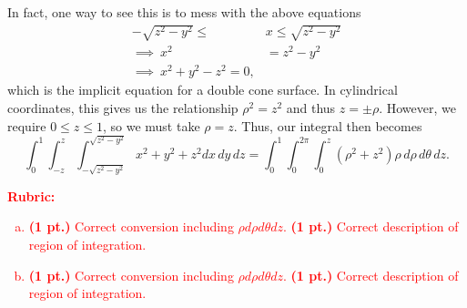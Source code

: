 \documentclass[12pt]{article} %
\begin{document}
\begin{solution}
\begin{enumerate}[(a)]
    In fact, one way to see this is to mess with the above equations
    \begin{align*}
        -\sqrt{z^2-y^2}\leq &x \leq \sqrt{z^2-y^2} \\
        \implies ~ x^2&= z^2-y^2 \\
        \implies ~ x^2+y^2-z^2=0,
    \end{align*}
    which is the implicit equation for a double cone surface. In cylindrical coordinates, this gives us the relationship $\rho^2=z^2$ and thus $z=\pm\rho$. However, we require $0\leq z \leq 1$, so we must take $\rho=z$.  Thus, our integral then becomes
    \[
    \int_0^1 \int_{-z}^z \int_{-\sqrt{z^2-y^2}}^{\sqrt{z^2-y^2}} x^2+y^2+z^2 dx\,dy\,dz = \int_{0}^1 \int_0^{2\pi} \int_{0}^z \left(\rho^2 + z^2 \right) \rho \, d\rho \, d \theta\, dz. 
    \]
    \end{enumerate}
\end{solution}
\vspace*{1cm}
\textcolor{red}{
\noindent \textbf{Rubric:}
\begin{enumerate}[(a)]
    \item \textbf{(1 pt.)} Correct conversion including $\rho d\rho d \theta dz$. \textbf{(1 pt.)} Correct description of region of integration.
	\item \textbf{(1 pt.)} Correct conversion including $\rho d\rho d \theta dz$. \textbf{(1 pt.)} Correct description of region of integration.
\end{enumerate}
}
\end{document}

